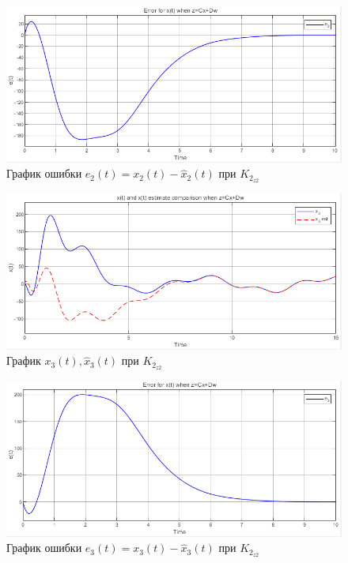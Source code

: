 \documentclass[a4paper, 12pt]{article}
\begin{document}
    \begin{figure}[H]
        \centering
        \includegraphics[scale=0.75]{3task_xe2cd.png}
        \captionsetup{skip=0pt}
        \caption{График ошибки $e_2(t)=x_2(t)-\hat{x}_2(t)$ при $K_{2_{z2}}$}
        \label{fig:3task_xe2cd}
    \end{figure}
    \begin{figure}[H]
        \centering
        \includegraphics[scale=0.75]{3task_xxh3cd.png}
        \captionsetup{skip=0pt}
        \caption{График $x_3(t),\hat{x}_3(t)$ при $K_{2_{z2}}$}
        \label{fig:3task_xxh3cd}
    \end{figure}
    \begin{figure}[H]
        \centering
        \includegraphics[scale=0.75]{3task_xe3cd.png}
        \captionsetup{skip=0pt}
        \caption{График ошибки $e_3(t)=x_3(t)-\hat{x}_3(t)$ при $K_{2_{z2}}$}
        \label{fig:3task_xe3cd}
    \end{figure}
\end{document}
